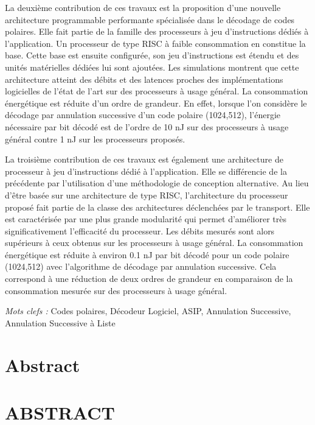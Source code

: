 La deuxième contribution de ces travaux est la proposition d'une nouvelle architecture programmable performante spécialisée dans le décodage de codes polaires. Elle fait partie de la famille des processeurs à jeu d'instructions dédiés à l'application. Un processeur de type RISC à faible consommation en constitue la base. Cette base est ensuite configurée, son jeu d'instructions est étendu et des unités matérielles dédiées lui sont ajoutées. Les simulations montrent que cette architecture atteint des débits et des latences proches des implémentations logicielles de l'état de l'art sur des processeurs à usage général. La consommation énergétique est réduite d'un ordre de grandeur. En effet, lorsque l'on considère le décodage par annulation successive d'un code polaire (1024,512), l'énergie nécessaire par bit décodé est de l'ordre de 10 nJ sur des processeurs à usage général contre 1 nJ sur les processeurs proposés.

La troisième contribution de ces travaux est également une architecture de processeur à jeu d'instructions dédié à l'application. Elle se différencie de la précédente par l'utilisation d'une méthodologie de conception alternative. Au lieu d'être basée sur une architecture de type RISC, l'architecture du processeur proposé fait partie de la classe des architectures déclenchées par le transport. Elle est caractérisée par une plus grande modularité qui permet d'améliorer très significativement l'efficacité du processeur. Les débits mesurés sont alors supérieurs à ceux obtenus sur les processeurs à usage général. La consommation énergétique est réduite à environ 0.1 nJ par bit décodé pour un code polaire (1024,512) avec l'algorithme de décodage par annulation successive. Cela correspond à une réduction de deux ordres de grandeur en comparaison de la consommation mesurée sur des processeurs à usage général.
 
\vskip0.5cm
\emph{Mots clefs :} Codes polaires, Décodeur Logiciel, ASIP, Annulation Successive, Annulation Successive à Liste
\cleardoublepage

{
\chapter*{Abstract}
}
{
\chapter*{ABSTRACT}\thispagestyle{headings}
}

